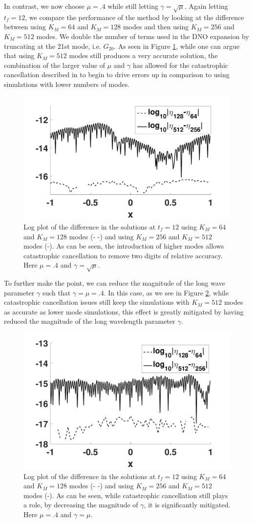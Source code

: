 \documentclass[a4paper,11pt]{article}
\begin{document}
In contrast, we now choose $\mu=.4$ while still letting $\gamma=\sqrt{\mu}$.  Again letting $t_{f}=12$, we compare the performance of the method by looking at the difference between using $K_{M}=64$ and $K_{M}=128$ modes and then using $K_{M}=256$ and $K_{M}=512$ modes.  We double the number of terms used in the DNO expansion by truncating at the 21st mode, i.e. $G_{20}$.  As seen in Figure \ref{fig:convcompfail}, while one can argue that using $K_{M}=512$  modes still produces a very accurate solution, the combination of the larger value of $\mu$ and $\gamma$ has allowed for the catastrophic cancellation described in \cite{wilkening} to begin to drive errors up in comparison to using simulations with lower numbers of modes.   
\begin{figure}[h]
\centering
\includegraphics[width=.48\textwidth]{conv_plot_mupt4_tf_12}
\caption{Log plot of the difference in the solutions at $t_{f}=12$ using $K_{M}=64$ and $K_{M}=128$ modes (- -) and using $K_{M}=256$ and $K_{M}=512$ modes (-).  As can be seen, the introduction of higher modes allows catastrophic cancellation to remove two digits of relative accuracy.  Here $\mu=.4$ and $\gamma=\sqrt{\mu}$.}
\label{fig:convcompfail}
\end{figure}
To further make the point, we can reduce the magnitude of the long wave parameter $\gamma$ such that $\gamma=\mu=.4$.  In this case, as we see in Figure \ref{fig:convcompcorrec}, while catastrophic cancellation issues still keep the simulations with $K_{M}=512$ modes as accurate as lower mode simulations, this effect is greatly mitigated by having reduced the magnitude of the long wavelength parameter $\gamma$.
\begin{figure}[h]
\centering
\includegraphics[width=.48\textwidth]{conv_plot_mupt4_gampt4_tf_12}
\caption{Log plot of the difference in the solutions at $t_{f}=12$ using $K_{M}=64$ and $K_{M}=128$ modes (- -) and using $K_{M}=256$ and $K_{M}=512$ modes (-).  As can be seen, while catastrophic cancellation still plays a role, by decreasing the magnitude of $\gamma$, it is significantly mitigated.  Here $\mu=.4$ and $\gamma=\mu$.}
\label{fig:convcompcorrec}
\end{figure}
\end{document}
